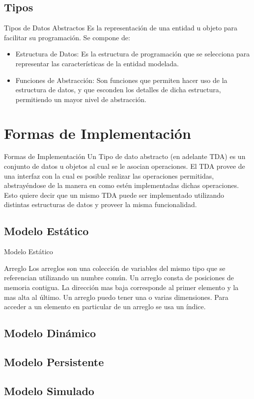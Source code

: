 \documentclass[11pt]{beamer}
\begin{document}
\subsection{Tipos}
\begin{frame}{Tipos de Datos Abstractos}
Es la representación de una entidad u objeto para facilitar su programación. Se compone de:
\begin{itemize}
\item \alert{Estructura de Datos:} Es la estructura de programación que se selecciona para representar las características de la entidad modelada.
\pause
\item \alert{Funciones de Abstracción:} Son funciones que permiten hacer uso de la estructura de datos, y que esconden los detalles de dicha estructura, permitiendo un mayor nivel de abstracción.
\end{itemize}
\end{frame}
\section{Formas de Implementación}
\begin{frame}{Formas de Implementación}
Un Tipo de dato abstracto (en adelante TDA) es un conjunto
de datos u objetos al cual se le asocian operaciones.
El TDA provee de una interfaz con la cual es posible realizar
las operaciones permitidas, \alert{abstrayéndose de la manera en
como estén implementadas} dichas operaciones. Esto
quiere decir que \alert{un mismo TDA puede ser implementado
utilizando distintas estructuras de datos} y proveer la
misma funcionalidad.
\end{frame}

\subsection{Modelo Estático}
\begin{frame}{Modelo Estático}
\begin{block}{Arreglo}
Los arreglos son una colección de variables del mismo tipo que se referencian utilizando un numbre común. Un arreglo consta de posiciones de memoria contigua. La dirección mas baja corresponde al primer elemento y la mas alta al último. Un arreglo puedo tener una o varias dimensiones. Para acceder a un elemento en particular de un arreglo se usa un índice.
\end{block}
\end{frame}
\subsection{Modelo Dinámico}
\subsection{Modelo Persistente}
\subsection{Modelo Simulado}
\end{document}

